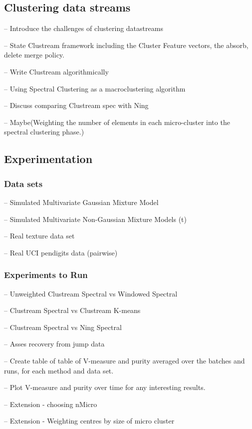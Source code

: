 \documentclass[11pt, a4]{article}
\let\oldmarginpar\marginpar
\renewcommand\marginpar[1]{\-\oldmarginpar[\raggedleft #1]
{\raggedright #1}}
\newenvironment{checklist}{
\begin{list}{}{}
  \let\olditem\item
\renewcommand\item{\olditem -- \marginpar{$\Box$}}
\newcommand\checkeditem{\olditem -- \marginpar{$\CheckedBox$}}
}{
\end{list}
}
\begin{document}
\subsection{Clustering data streams}
\label{sec:clustream}
\begin{checklist}
\checkeditem Introduce the challenges of clustering datastreams
\checkeditem State Clustream framework including the Cluster Feature vectors, the absorb, delete merge policy.  
\checkeditem Write Clustream algorithmically
\item Using Spectral Clustering as a macroclustering algorithm
\item Discuss comparing Clustream spec with Ning
\item Maybe(Weighting the number of elements in each micro-cluster into the spectral clustering phase.)
\end{checklist}

\subsection{Experimentation}

\subsubsection{Data sets}
\begin{checklist}
\checkeditem Simulated Multivariate Gaussian Mixture Model
\checkeditem Simulated Multivariate Non-Gaussian Mixture Models (t)
\item Real texture data set
\checkeditem Real UCI pendigits data (pairwise)
\end{checklist}

\subsubsection{Experiments to Run}
\begin{checklist}
\item Unweighted Clustream Spectral vs Windowed Spectral
\checkeditem Clustream Spectral vs Clustream K-means 
\item Clustream Spectral vs Ning Spectral
\item Asses recovery from jump data
\item Create table of table of V-measure and purity averaged over the batches and runs, for each method and data set.
\item Plot V-measure and purity over time for any interesting results.
\item Extension - choosing nMicro
\item Extension - Weighting centres by size of micro cluster
\end{checklist}
\end{document}
